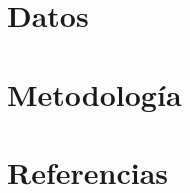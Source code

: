\documentclass[12pt]{article}
\begin{document}
\section{Datos}


\section{Metodología}






\newpage
%
%
\section*{Referencias}
\end{document}
